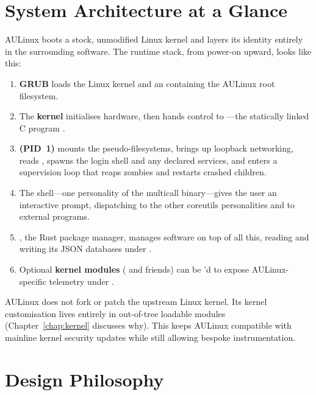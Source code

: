 \section{System Architecture at a Glance}

AULinux boots a stock, unmodified Linux kernel and layers its identity entirely
in the surrounding software. The runtime stack, from power-on upward, looks like
this:

\begin{enumerate}
  \item \textbf{GRUB} loads the Linux kernel and an  containing
        the AULinux root filesystem.
  \item The \textbf{kernel} initialises hardware, then hands control to
        ---the statically linked C program .
  \item \textbf{ (PID~1)} mounts the pseudo-filesystems, brings up
        loopback networking, reads , spawns the
        login shell and any declared services, and enters a supervision loop that
        reaps zombies and restarts crashed children.
  \item The \textbf{} shell---one personality of the 
        multicall binary---gives the user an interactive prompt, dispatching to
        the other coreutils personalities and to external programs.
  \item \textbf{}, the Rust package manager, manages software on top
        of all this, reading and writing its JSON databases under
        .
  \item Optional \textbf{kernel modules} ( and friends) can be
        'd to expose AULinux-specific telemetry under .
\end{enumerate}

\begin{notebox}
AULinux does not fork or patch the upstream Linux kernel. Its kernel
customisation lives entirely in out-of-tree loadable modules
(Chapter~\ref{chap:kernel} discusses why). This keeps AULinux compatible with
mainline kernel security updates while still allowing bespoke instrumentation.
\end{notebox}

\section{Design Philosophy}

